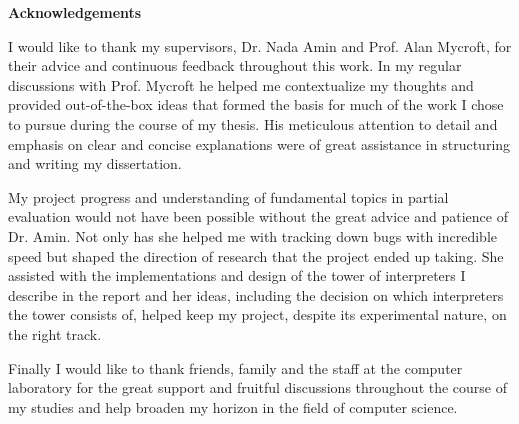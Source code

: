\newpage
{\Huge \bf Acknowledgements}

\vspace{24pt} 
I would like to thank my supervisors, Dr. Nada Amin and Prof. Alan Mycroft, for their advice and continuous feedback throughout this work. In my regular discussions with Prof. Mycroft he helped me contextualize my thoughts and provided out-of-the-box ideas that formed the basis for much of the work I chose to pursue during the course of my thesis. His meticulous attention to detail and emphasis on clear and concise explanations were of great assistance in structuring and writing my dissertation.

My project progress and understanding of fundamental topics in partial evaluation would not have been possible without the great advice and patience of Dr. Amin. Not only has she helped me with tracking down bugs with incredible speed but shaped the direction of research that the project ended up taking. She assisted with the implementations and design of the tower of interpreters I describe in the report and her ideas, including the decision on which interpreters the tower consists of, helped keep my project, despite its experimental nature, on the right track.

Finally I would like to thank friends, family and the staff at the computer laboratory for the great support and fruitful discussions throughout the course of my studies and help broaden my horizon in the field of computer science.

\vfill

\newpage
\vspace*{\fill}